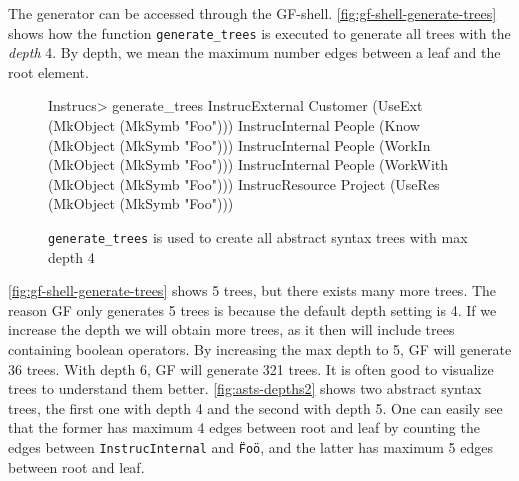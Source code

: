 The generator can be accessed through the GF-shell. \autoref{fig:gf-shell-generate-trees} shows how the function \texttt{generate\_trees} is executed to generate all trees with the \emph{depth} 4. By depth, we mean the maximum number edges between a leaf and the root element.

\begin{figure}[H]
\begin{terminal}
Instrucs> generate_trees
InstrucExternal Customer (UseExt (MkObject (MkSymb "Foo")))
InstrucInternal People (Know (MkObject (MkSymb "Foo")))
InstrucInternal People (WorkIn (MkObject (MkSymb "Foo")))
InstrucInternal People (WorkWith (MkObject (MkSymb "Foo")))
InstrucResource Project (UseRes (MkObject (MkSymb "Foo")))
\end{terminal}
\caption{\texttt{generate\_trees} is used to create all abstract syntax trees with max depth 4\label{fig:gf-shell-generate-trees}}
\end{figure}

\autoref{fig:gf-shell-generate-trees} shows 5 trees, but there exists many more trees. The reason GF only generates 5 trees is because the default depth setting is 4. If we increase the depth we will obtain more trees, as it then will include trees containing boolean operators. By increasing the max depth to 5, GF will generate 36 trees. With depth 6, GF will generate 321 trees.
\newline
\newline
It is often good to visualize trees to understand them better. \autoref{fig:asts-depths2} shows two abstract syntax trees, the first one with depth 4 and the second with depth 5. One can easily see that the former has maximum 4 edges between root and leaf by counting the edges between \texttt{InstrucInternal} and \texttt{\"Foo\"}, and the latter has maximum 5 edges between root and leaf.

